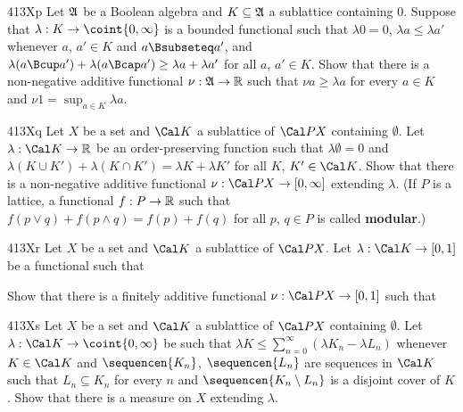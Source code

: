 {\spheader 413Xp Let $\frak A$ be a Boolean algebra and
$K\subseteq\frak A$ a sublattice containing $0$.   Suppose that
$\lambda:K\to\coint{0,\infty}$
is a bounded functional such that $\lambda 0=0$,
$\lambda a\le\lambda a'$ whenever $a$, $a'\in K$ and $a\Bsubseteq a'$,
and $\lambda(a\Bcup a')+\lambda(a\Bcap a')\ge\lambda a+\lambda a'$ for
all $a$, $a'\in K$.   Show that there is a non-negative additive
functional $\nu:\frak A\to\Bbb R$ such that $\nu a\ge\lambda a$ for
every $a\in K$ and $\nu 1=\sup_{a\in K}\lambda a$.

\spheader 413Xq Let $X$ be a set and $\Cal K$ a sublattice of $\Cal PX$
containing $\emptyset$.   Let $\lambda:\Cal K\to\Bbb R$ be an
order-preserving function such that $\lambda\emptyset=0$ and
$\lambda(K\cup K')+\lambda(K\cap K')=\lambda K+\lambda K'$ for all $K$,
$K'\in\Cal K$.   Show that there is a non-negative additive functional
$\nu:\Cal PX\to[0,\infty]$ extending $\lambda$.   
(If $P$ is a lattice, a functional $f:P\to\Bbb R$ such that
$f(p\vee q)+f(p\wedge q)=f(p)+f(q)$ for all $p$, $q\in P$ is called
{\bf modular}.)

\spheader 413Xr Let $X$ be a set and $\Cal K$ a sublattice of
$\Cal PX$.   Let $\lambda:\Cal K\to[0,1]$ be a functional
such that



\noindent Show that there is a finitely
additive functional $\nu:\Cal PX\to[0,1]$ such that


\spheader 413Xs Let $X$ be a set and $\Cal K$ a sublattice of $\Cal PX$
containing $\emptyset$.   Let $\lambda:\Cal K\to\coint{0,\infty}$ be such
that $\lambda K\le\sum_{n=0}^{\infty}(\lambda K_n-\lambda L_n)$ whenever
$K\in\Cal K$ and $\sequencen{K_n}$, $\sequencen{L_n}$ are sequences in
$\Cal K$ such that $L_n\subseteq K_n$ for every $n$ and
$\sequencen{K_n\setminus L_n}$ is a disjoint cover of
$K$.   Show that there is a measure on $X$ extending $\lambda$.

}
